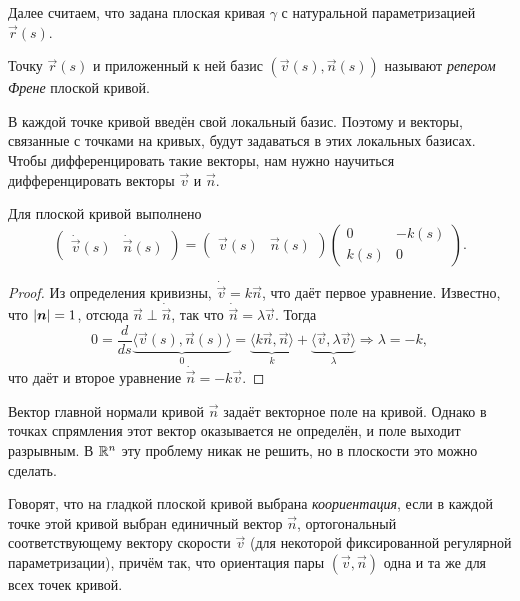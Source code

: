 Далее считаем, что задана плоская кривая $\gamma$ с натуральной параметризацией $\vec{r}(s)$.

\begin{definition}
	Точку $\vec{r}(s)$ и приложенный к ней базис $(\vec{v}(s), \vec{n}(s))$ называют \textit{репером Френе} плоской кривой.
\end{definition}

В каждой точке кривой введён свой локальный базис. Поэтому и векторы, связанные с точками на кривых, будут задаваться в этих локальных базисах. Чтобы дифференцировать такие векторы, нам нужно научиться дифференцировать векторы $\vec{v}$ и $\vec{n}$.

\begin{theorem}
	Для плоской кривой выполнено
	\begin{equation} \label{eq:PlaneFrenet}
		\begin{pmatrix}
			\dot{\vec{v}}(s) & \dot{\vec{n}}(s)
		\end{pmatrix} = 
		\begin{pmatrix}
			\vec{v}(s) & \vec{n}(s)
		\end{pmatrix}
		\begin{pmatrix}
			0 & -k(s)\\
			k(s) & 0
		\end{pmatrix}.
	\end{equation}
\end{theorem}

\begin{proof}
	Из определения кривизны, $\dot{\vec{v}} = k\vec{n}$, что даёт первое уравнение. Известно, что $\left\lvert\boldsymbol{n}\right\rvert = 1$, отсюда $\vec{n} \perp \dot{\vec{n}}$, так что $\dot{\vec{n}} = \lambda\vec{v}$. Тогда
	\[
		0 = \frac{d}{ds}\underbrace{\langle \vec{v}(s), \vec{n}(s)\rangle}_{0} = \underbrace{\langle k\vec{n}, \vec{n}\rangle}_{k} + \underbrace{\langle \vec{v}, \lambda\vec{v} \rangle}_{\lambda} \Rightarrow \lambda = -k,
	\]
	что даёт и второе уравнение $\dot{\vec{n}} = -k\vec{v}$.
\end{proof}

Вектор главной нормали кривой $\vec{n}$ задаёт векторное поле на кривой. Однако в точках спрямления этот вектор оказывается не определён, и поле выходит разрывным. В $\mathbb{R}^n$ эту проблему никак не решить, но в плоскости это можно сделать.

\begin{definition}
	Говорят, что на гладкой плоской кривой выбрана \textit{коориентация}, если в каждой точке этой кривой выбран единичный вектор $\vec{n}$, ортогональный соответствующему вектору скорости $\vec{v}$ (для некоторой фиксированной регулярной параметризации), причём так, что ориентация пары $(\vec{v}, \vec{n})$ одна и та же для всех точек кривой\footnotemark{}.
\end{definition}


